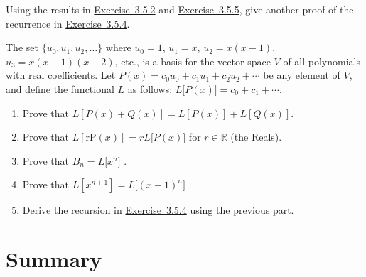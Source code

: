 \documentclass[10pt,]{book}
\theoremstyle{plain}
\theoremstyle{definition}
\theoremstyle{definition}
\theoremstyle{definition}
\theoremstyle{definition}
\numberwithin{equation}{chapter}
\def\R{\mathbb R}
\begin{document}
\begin{divisionexercise}{6}\hypertarget{exercise-120}{}
\hypertarget{p-1149}{}%
Using the results in \hyperlink{ex-bell-as-stirlings}{Exercise~3.5.2} and \hyperlink{ex-stirling-recurrence}{Exercise~3.5.5}, give another proof of the recurrence in \hyperlink{ex-bell-recurrence}{Exercise~3.5.4}.%
\end{divisionexercise}%
\begin{divisionexercise}{7}\hypertarget{exercise-121}{}
\hypertarget{p-1150}{}%
The set \(\{u_{0}, u_{1}, u_{2}, \ldots \}\) where \(u_{0} = 1\), \(u_{1} = x\), \(u_{2} = x(x - 1)\), \(u_{3} = x(x - 1)(x - 2)\), etc., is a basis for the vector space \(V\) of all polynomials with real coefficients. Let \(P(x) = c_{0}u_{0} + c_{1}u_{1} + c_{2}u_{2} + \cdots\) be any element of \(V\), and define the functional \(L\) as follows: \(L\lbrack P(x)\rbrack = c_{0} + c_{1} + \cdots\).%
\par
\hypertarget{p-1151}{}%
\leavevmode%
\begin{enumerate}[label=(\alph*)]
\item\hypertarget{li-230}{}\hypertarget{p-1152}{}%
Prove that \(L\left\lbrack P\left( x \right) + Q\left( x \right) \right\rbrack = L\left\lbrack P\left( x \right) \right\rbrack + L\left\lbrack Q\left( x \right) \right\rbrack.\)%
\item\hypertarget{li-231}{}\hypertarget{p-1153}{}%
Prove that \(L\left\lbrack \text{rP}\left( x \right) \right\rbrack = rL\lbrack P\left( x \right)\rbrack\) for \(r \in \R\) (the Reals).%
\item\hypertarget{li-232}{}\hypertarget{p-1154}{}%
Prove that \(B_{n} = L\lbrack x^{n}\rbrack\) .%
\item\hypertarget{li-233}{}\hypertarget{p-1155}{}%
Prove that \(L\left\lbrack x^{n + 1} \right\rbrack = L\lbrack\left( x + 1 \right)^{n}\rbrack\) .%
\item\hypertarget{li-234}{}\hypertarget{p-1156}{}%
Derive the recursion in \hyperlink{ex-bell-recurrence}{Exercise~3.5.4} using the previous part.%
\end{enumerate}
%
\end{divisionexercise}%
\typeout{************************************************}
\typeout{************************************************}
\section[{Summary}]{Summary}\label{sec_adv-conc}
%
%
%
\appendix
%
\typeout{************************************************}
\typeout{************************************************}
\end{document}
